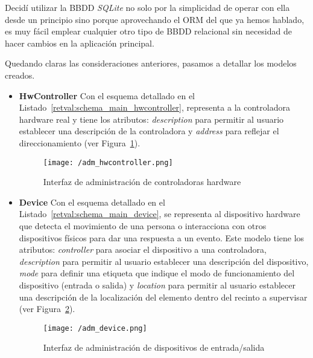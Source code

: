 Decidí utilizar la \acs{BBDD} \textit{SQLite} no solo por la simplicidad de operar con ella desde un principio sino porque aprovechando el \acs{ORM} del que ya hemos hablado, es muy fácil emplear cualquier otro tipo de \acs{BBDD} relacional sin necesidad de hacer cambios en la aplicación principal.

Quedando claras las consideraciones anteriores, pasamos a detallar los modelos creados.

\begin{itemize}
\item \textbf{HwController} Con el esquema detallado en el Listado~\ref{retval:schema_main_hwcontroller}, representa a la controladora hardware real y tiene los atributos: \textit{description} para permitir al usuario establecer una descripción de la controladora y \textit{address} para reflejar el direccionamiento (ver Figura~\ref{fig:adm_hwcontroller}).

\begin{figure}[hp]
\centering
\texttt{[image: /adm\_hwcontroller.png]}
\caption{Interfaz de administración de controladoras hardware}
\label{fig:adm_hwcontroller}
\end{figure}




\item \textbf{Device} Con el esquema detallado en el Listado~\ref{retval:schema_main_device}, se representa al dispositivo hardware que detecta el movimiento de una persona o interacciona con otros dispositivos físicos para dar una respuesta a un evento. Este modelo tiene los atributos: \textit{controller} para asociar el dispositivo a una controladora, \textit{description} para permitir al usuario establecer una descripción del dispositivo, \textit{mode} para definir una etiqueta que indique el modo de funcionamiento del dispositivo (entrada o salida) y \textit{location} para permitir al usuario establecer una descripción de la localización del elemento dentro del recinto a supervisar (ver Figura~\ref{fig:adm_device}).

\begin{figure}[hp]
\centering
\texttt{[image: /adm\_device.png]}
\caption{Interfaz de administración de dispositivos de entrada/salida}
\label{fig:adm_device}
\end{figure}


\end{itemize}
